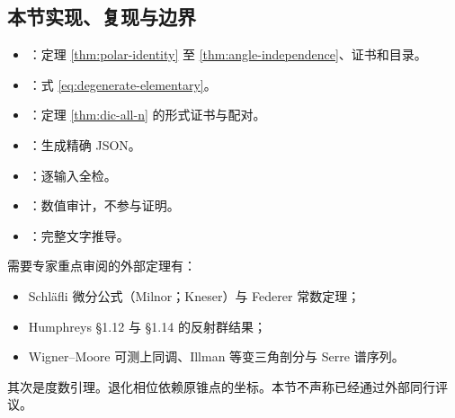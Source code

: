 \subsection{本节实现、复现与边界}

\begin{itemize}
\item {}：定理 \ref{thm:polar-identity} 至 \ref{thm:angle-independence}、证书和目录。
\item {}：式 \eqref{eq:degenerate-elementary}。
\item {}：定理 \ref{thm:dic-all-n} 的形式证书与配对。
\item {}：生成精确 JSON。
\item {}：逐输入全检。
\item {}：数值审计，不参与证明。
\item {}：完整文字推导。
\end{itemize}
需要专家重点审阅的外部定理有：
\begin{itemize}
\item Schläfli 微分公式（Milnor；Kneser）与 Federer 常数定理；
\item Humphreys \S1.12 与 \S1.14 的反射群结果；
\item Wigner--Moore 可测上同调、Illman 等变三角剖分与 Serre 谱序列。
\end{itemize}
其次是度数引理。退化相位依赖原锥点的坐标。本节不声称已经通过外部同行评议。
